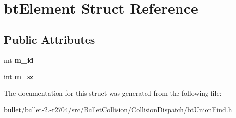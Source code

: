 \hypertarget{structbt_element}{\section{bt\+Element Struct Reference}
\label{structbt_element}
}
\subsection*{Public Attributes}
\begin{DoxyCompactItemize}
\item 
\hypertarget{structbt_element_a594cc544e758bd7235492c51e8b357f3}{int {\bfseries m\+\_\+id}}\label{structbt_element_a594cc544e758bd7235492c51e8b357f3}

\item 
\hypertarget{structbt_element_a8f8cebe2348b576a415e9a475fbabc03}{int {\bfseries m\+\_\+sz}}\label{structbt_element_a8f8cebe2348b576a415e9a475fbabc03}

\end{DoxyCompactItemize}


The documentation for this struct was generated from the following file\+:\begin{DoxyCompactItemize}
\item 
bullet/bullet-\/2.-\/r2704/src/\+Bullet\+Collision/\+Collision\+Dispatch/bt\+Union\+Find.\+h\end{DoxyCompactItemize}
